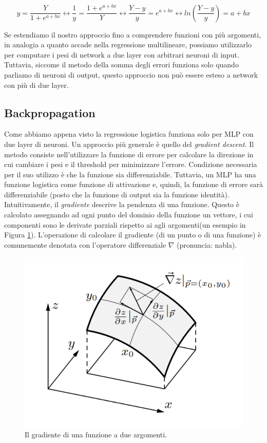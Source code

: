 \documentclass[10pt,a4paper]{article}
\begin{document}
$$
y = \frac{Y}{1 + e^{a+bx}} \leftrightarrow \frac{1}{y} = \frac{1 + e^{a+bx}}{Y} \leftrightarrow \frac{Y - y}{y} = e^{a+bx} \leftrightarrow ln(\frac{Y - y}{y}) = a+bx
$$

Se estendiamo il nostro approccio fino a comprendere funzioni con più argomenti, in analogia a quanto accade nella regressione multilineare, possiamo utilizzarlo per computare i pesi di network a due layer con arbitrari neuroni di input. Tuttavia, siccome il metodo della somma degli errori funziona solo quando parliamo di neuroni di output, questo approccio non può essere esteso a network con più di due layer.

\subsection{Backpropagation}

Come abbiamo appena visto la regressione logistica funziona solo per MLP con due layer di neuroni. Un approccio più generale è quello del \emph{gradient descent}. Il metodo consiste nell'utilizzare la funzione di errore per calcolare la direzione in cui cambiare i pesi e il threshold per minimizzare l'errore. Condizione necessaria per il suo utilizzo è che la funzione sia differenziabile. Tuttavia, un MLP ha una funzione logistica come funzione di attivazione e, quindi, la funzione di errore sarà differenziabile (posto che la funzione di output sia la funzione identità).
Intuitivamente, il \emph{gradiente} descrive la pendenza di una funzione. Questo è calcolato assegnando ad ogni punto del dominio della funzione un vettore, i cui componenti sono le derivate parziali rispetto ai agli argomenti(un esempio in Figura \ref{fig:13}). L'operazione di calcolare il gradiente (di un punto o di una funzione) è comunemente denotata con l'operatore differenziale $\nabla$ (pronuncia: nabla).

\begin{figure}
\centering
\includegraphics[scale=0.3]{img/gradient.png}
\caption{Il gradiente di una funzione a due argomenti.}
\label{fig:13}
\end{figure}
\end{document}
